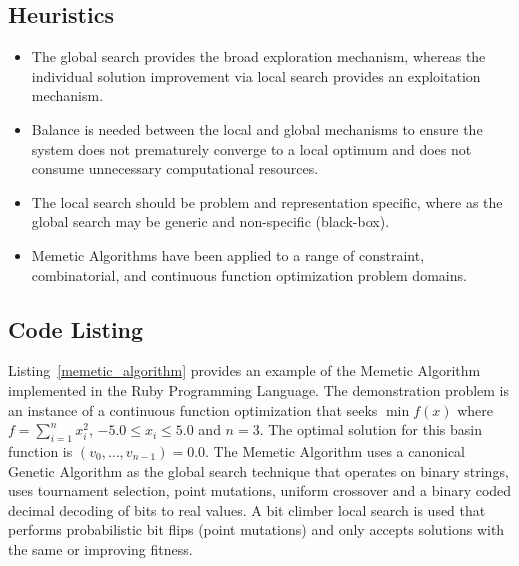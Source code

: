 \subsection{Heuristics}
\begin{itemize}
	\item The global search provides the broad exploration mechanism, whereas the individual solution improvement via local search provides an exploitation mechanism. 
	\item Balance is needed between the local and global mechanisms to ensure the system does not prematurely converge to a local optimum and does not consume unnecessary computational resources.
	\item The local search should be problem and representation specific, where as the global search may be generic and non-specific (black-box).
	\item Memetic Algorithms have been applied to a range of constraint, combinatorial, and continuous function optimization problem domains.
\end{itemize}

\subsection{Code Listing}
Listing~\ref{memetic_algorithm} provides an example of the Memetic Algorithm implemented in the Ruby Programming Language. 
The demonstration problem is an instance of a continuous function optimization that seeks $\min f(x)$ where $f=\sum_{i=1}^n x_{i}^2$, $-5.0\leq x_i \leq 5.0$ and $n=3$. The optimal solution for this basin function is $(v_0,\ldots,v_{n-1})=0.0$.
The Memetic Algorithm uses a canonical Genetic Algorithm as the global search technique that operates on binary strings, uses tournament selection, point mutations, uniform crossover and a binary coded decimal decoding of bits to real values. A bit climber local search is used that performs probabilistic bit flips (point mutations) and only accepts solutions with the same or improving fitness. 


